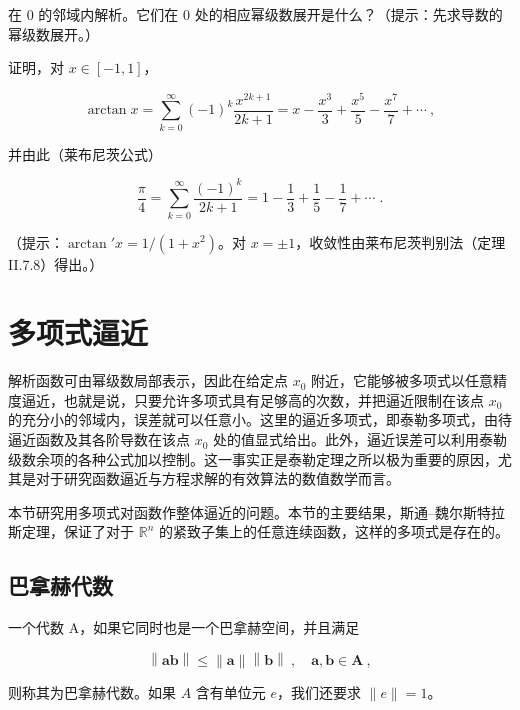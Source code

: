 \begin{exercises}
在 0 的邻域内解析。它们在 0 处的相应幂级数展开是什么？（提示：先求导数的幂级数展开。）

\item[11.]

证明，对 $ x \in [-1, 1] $，

\[
\arctan x=\sum_{k=0}^{\infty}(-1)^{k}\frac{x^{2k+1}}{2k+1}=x-\frac{x^{3}}{3}+\frac{x^{5}}{5}-\frac{x^{7}}{7}+\cdots\ ,
\]

并由此（莱布尼茨公式）

\[
\frac{\pi}{4}=\sum_{k=0}^{\infty}\frac{(-1)^{k}}{2k+1}=1-\frac{1}{3}+\frac{1}{5}-\frac{1}{7}+\cdots\;.
\]

（提示：$ \arctan' x = 1/(1 + x^2) $。对 $ x = \pm 1 $，收敛性由莱布尼茨判别法（定理 II.7.8）得出。）

\end{exercises}

\section{多项式逼近}

解析函数可由幂级数局部表示，因此在给定点  $ x_{0} $ 附近，它能够被多项式以任意精度逼近，也就是说，只要允许多项式具有足够高的次数，并把逼近限制在该点  $ x_{0} $ 的充分小的邻域内，误差就可以任意小。这里的逼近多项式，即泰勒多项式，由待逼近函数及其各阶导数在该点  $ x_{0} $ 处的值显式给出。此外，逼近误差可以利用泰勒级数余项的各种公式加以控制。这一事实正是泰勒定理之所以极为重要的原因，尤其是对于研究函数逼近与方程求解的有效算法的数值数学而言。

本节研究用多项式对函数作整体逼近的问题。本节的主要结果，斯通–魏尔斯特拉斯定理，保证了对于  $ \mathbb{R}^n $ 的紧致子集上的任意连续函数，这样的多项式是存在的。

\subsection*{巴拿赫代数}

一个代数 A，如果它同时也是一个巴拿赫空间，并且满足

\[
\left\| \mathbf{a} \mathbf{b} \right\|\leq \left\| \mathbf{a} \right\| \left\| \mathbf{b} \right\| ~, \quad \mathbf{a},\mathbf{b}\in \mathbf{A}~,
\]

则称其为巴拿赫代数。如果  $ A $ 含有单位元  $ e $，我们还要求  $ \|e\| = 1 $。

